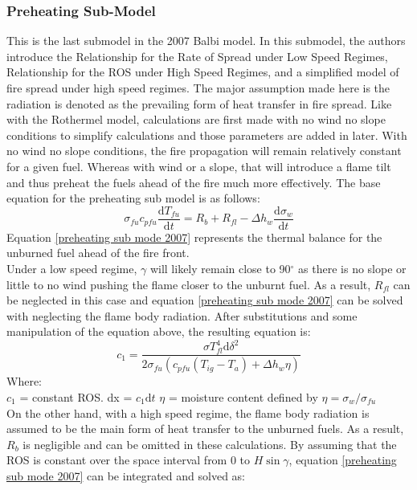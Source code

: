 \documentclass{article}
\begin{document}
\subsubsection{Preheating Sub-Model}
\indent This is the last submodel in the 2007 Balbi model. In this submodel, the authors introduce the Relationship for the Rate of Spread under Low Speed Regimes, Relationship for the ROS under High Speed Regimes, and a simplified model of fire spread under high speed regimes. The major assumption made here is the radiation is denoted as the prevailing form of heat transfer in fire spread. Like with the Rothermel model, calculations are first made with no wind no slope conditions to simplify calculations and those parameters are added in later. With no wind no slope conditions, the fire propagation will remain relatively constant  for a given fuel. Whereas with wind or a slope, that will introduce a flame tilt and thus preheat the fuels ahead of the fire much more effectively. The base equation for the preheating sub model is as follows:
\begin{equation}
	\label{preheating sub mode 2007}
	\sigma _ {fu} c _{pfu} \frac {\mathrm{d} T_{fu}} {\mathrm{d} t} = R_b + R_{fl} - \Delta h_w \frac {\mathrm{d} \sigma _ w } {\mathrm {d} t}
\end{equation}
Equation \ref{preheating sub mode 2007} represents the thermal balance for the unburned fuel ahead of the fire front. \\
\indent Under a low speed regime, $\gamma$ will likely remain close to 90$^{\circ}$ as there is no slope or little to no wind pushing the flame closer to the unburnt fuel. As a result, $R_{fl}$ can be neglected in this case and equation \ref{preheating sub mode 2007} can be solved with neglecting the flame body radiation. After substitutions and some manipulation of the equation above, the resulting equation is:
\begin{equation}
	\label{low regime ros}
	c_1 = \frac {\sigma T^{4}_{fl} \mathrm {d} \delta ^ 2} {2 \sigma _ {fu} (c_{pfu}(T_{ig} - T_a) + \Delta h _ w \eta)}
\end{equation}
Where:\\
$c_1$ = constant ROS. 
dx = $c_1 \mathrm{d}t$
$\eta$ = moisture content defined by $\eta = \sigma _ w / \sigma _ {fu}$ \\
\indent On the other hand, with a high speed regime, the flame body radiation is assumed to be the main form of heat transfer to the unburned fuels. As a result, $R_b$ is negligible and can be omitted in these calculations. By assuming that the ROS is constant over the space interval from 0 to $H \sin \gamma$, equation \ref{preheating sub mode 2007} can be integrated and solved as:
\end{document}
